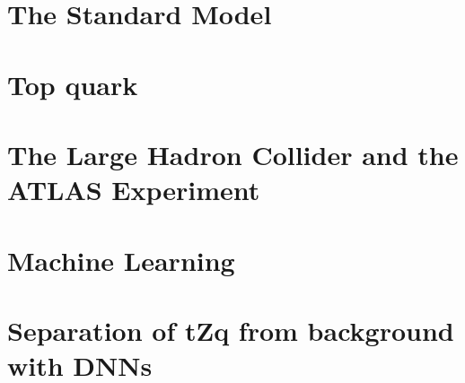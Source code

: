 \documentclass[a4paper,11pt,twoside]{book}
\begin{document}
\mainmatter

\chapter{The Standard Model}



\chapter{Top quark}



\chapter{The Large Hadron Collider and the ATLAS Experiment}



\chapter{Machine Learning}


\chapter{Separation of tZq from background with DNNs} 



\backmatter
{}
\end{document}
